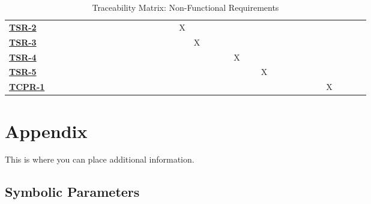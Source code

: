 \documentclass[12pt, titlepage]{article}
\begin{document}
\begin{landscape}
\begin{table}
\begin{adjustbox}{width=1.2\textwidth}
\begin{tabular}{l|ccccccccccccccccccccccccc}
        \hyperref[TSR-2]{\textbf{TSR-2}}  & ~ & ~ & ~ & ~ & ~ & ~ & ~ & ~ & ~ & ~ & X & ~ & ~ & ~ & ~ & ~ & ~ & ~ & ~ & ~ & ~ & ~ & ~\\
        \hyperref[TSR-3]{\textbf{TSR-3}}  & ~ & ~ & ~ & ~ & ~ & ~ & ~ & ~ & ~ & ~ & ~ & X & ~ & ~ & ~ & ~ & ~ & ~ & ~ & ~ & ~ & ~ & ~\\
        \hyperref[TSR-4]{\textbf{TSR-4}}  & ~ & ~ & ~ & ~ & ~ & ~ & ~ & ~ & ~ & ~ & ~ & ~ & ~ & ~ & X & ~ & ~ & ~ & ~ & ~ & ~ & ~ & ~\\
        \hyperref[TSR-5]{\textbf{TSR-5}}  & ~ & ~ & ~ & ~ & ~ & ~ & ~ & ~ & ~ & ~ & ~ & ~ & ~ & ~ & ~ & ~ & X & ~ & ~ & ~ & ~ & ~ & ~\\
        \hyperref[TCPR-1]{\textbf{TCPR-1}}  & ~ & ~ & ~ & ~ & ~ & ~ & ~ & ~ & ~ & ~ & ~ & ~ & ~ & ~ & ~ & ~ & ~ & ~ & ~ & ~ & ~ &  X\\
    \end{tabular}
    \end{adjustbox}
    \caption{Traceability Matrix: Non-Functional Requirements}
    \label{Traceability Matrix: Non-Functional Requirements}
\end{table}
\end{landscape}
\pagestyle{plain}%
\clearpage

				




\newpage

\section{Appendix}

This is where you can place additional information.

\subsection{Symbolic Parameters}
\end{document}

